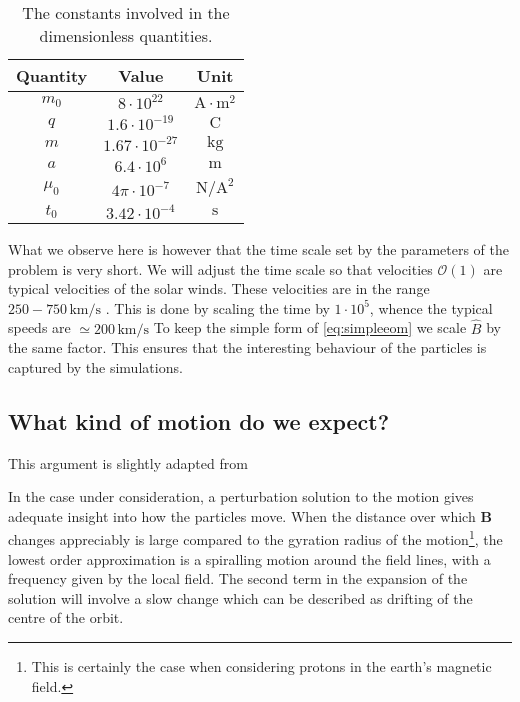 \begin{table}[h]
	\centering
	\caption{The constants involved in the dimensionless quantities.}
	
	\begin{tabular}{ccc}
		\toprule
		Quantity & Value & Unit \\
		\midrule
		$m_0$ & $8   \cdot 10^{22}$ & $\text{A} \cdot \text{m}^2$ \\
		$q$   & $1.6 \cdot 10^{-19}$ & $\text{C}$ \\
		$m$   & $1.67 \cdot 10^{-27}$ & $\text{kg}$ \\
		$a$   & $6.4 \cdot 10^{6}$   & $\text{m}$ \\
		$\mu_0$ &$4\pi \cdot 10 ^{-7}$ & $\text{N}/{\text{A}^2}$ \\
		$t_0$ & $3.42 \cdot 10^{-4}$ & $\text{s}$ \\
		\bottomrule
	\end{tabular}
\end{table}

What we observe here is however that the time scale set by the parameters of the problem is very short. We will adjust the time scale so that velocities $\mathcal{O}(1)$ are typical velocities of the solar winds. These velocities are in the range $250-750 \, \text{km}/\text{s}$ \cite{Khabarova_2018}. This is done by scaling the time by $1\cdot10^5$, whence the typical speeds are $\simeq 200 \, \text{km}/\text{s}$ To keep the simple form of \eqref{eq:simpleeom} we scale $\hat{B}$ by the same factor. This ensures that the interesting behaviour of the particles is captured by the simulations. 

\subsection*{What kind of motion do we expect?}

This argument is slightly adapted from \cite[sec.~12.4]{Jackson:100964}

In the case under consideration, a perturbation solution to the motion gives adequate insight into how the particles move. When the distance over which $\mathbf{B}$ changes appreciably is large compared to the gyration radius of the motion\footnote{This is certainly the case when considering protons in the earth's magnetic field.}, the lowest order approximation is a spiralling motion around the field lines, with a frequency given by the local field. The second term in the expansion of the solution will involve a slow change which can be described as drifting of the centre of the orbit. 

